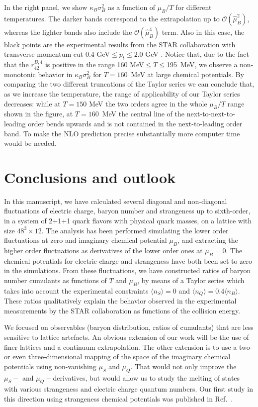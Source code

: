\documentclass[a4paper,11pt]{article}
\begin{document}
In the right panel, we show $\kappa_B  \sigma^2_B$ as a function of $\mu_B/T$
for different temperatures. The darker bands correspond to the extrapolation up
to $\mathcal{O}(\hat{\mu}_B^2)$, whereas the lighter bands also include the
$\mathcal{O}(\hat{\mu}_B^4)$ term. Also in this case, the black points are the
experimental results from the STAR collaboration with transverse momentum cut
0.4 GeV$\leq p_t\leq2.0$ GeV \cite{Luo:2015ewa,Thader:2016gpa}. Notice that,
due to the fact that the $r_{42}^{B,4}$ is positive in the range 160 MeV$\leq
T\leq$195~MeV, we observe a non-monotonic behavior in $\kappa_B  \sigma^2_B$
for $T=160$~MeV at large chemical potentials. By comparing the two different
truncations of the Taylor series we can conclude that, as we increase the
temperature, the range of applicability of our Taylor series decreases: while
at $T=150$ MeV the two orders agree in the whole $\mu_B/T$ range shown in the
figure, at $T=160$~MeV the central line of the next-to-next-to-leading order
bends upwards and is not contained in the next-to-leading order band.
To make the NLO prediction precise substantially more computer time
would be needed.

\section{Conclusions and outlook \label{sec:con}}
In this manuscript, we have calculated several diagonal and non-diagonal fluctuations of electric charge, baryon number and strangeness up to sixth-order, in a system of 2+1+1 quark flavors with physical quark masses, on a lattice with size $48^3\times12$. The analysis has been performed simulating the lower order fluctuations at zero and imaginary chemical potential $\mu_B$, and extracting the higher order fluctuations as derivatives of the lower order ones at $\mu_B=0$. The chemical potentials for electric charge and strangeness have both been set to zero in the simulations. From these fluctuations, we have constructed ratios of baryon number cumulants as functions of $T$ and $\mu_B$, by means of a Taylor series which takes into account the experimental constraints $\langle n_S\rangle=0$ and $\langle n_Q\rangle=0.4\langle n_B\rangle$. These ratios qualitatively explain the behavior observed in the experimental measurements by the STAR collaboration as functions of the collision energy.

We focused on observables (baryon distribution, ratios of cumulants) that are less sensitive to lattice
artefacts. An obvious extension of our work will be the use of finer lattices and a continuum extrapolation.
The other extension is to use a two- or even three-dimensional mapping of the space of the imaginary chemical
potentials using non-vanishing $\mu_S$ and $\mu_Q$. That would not only improve the $\mu_S-$ and $\mu_Q-$derivatives, but would allow us to study the melting of states with
various strangeness and electric charge quantum numbers. Our first study in
this direction using strangeness chemical potentials was published in
Ref.~\cite{Alba:2017mqu}.
\end{document}
